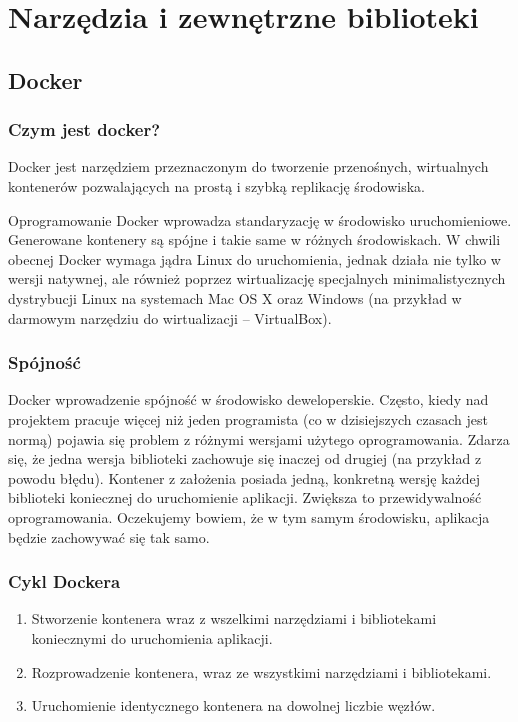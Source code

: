 \chapter{Narzędzia i zewnętrzne biblioteki}

\section{Docker}

\subsection[Czym jest docker?]{Czym jest docker?}
\par{Docker jest narzędziem przeznaczonym do tworzenie przenośnych, wirtualnych kontenerów pozwalających na prostą i szybką replikację środowiska.}

\par{Oprogramowanie Docker wprowadza standaryzację w środowisko uruchomieniowe. Generowane kontenery są spójne i takie same w różnych środowiskach. W chwili obecnej Docker wymaga jądra Linux do uruchomienia, jednak działa nie tylko w wersji natywnej, ale również poprzez wirtualizację specjalnych minimalistycznych dystrybucji Linux na systemach Mac OS X oraz Windows (na przykład w darmowym narzędziu do wirtualizacji – VirtualBox).}

\subsection[Spójność]{Spójność}

\par{Docker wprowadzenie spójność w środowisko deweloperskie. Często, kiedy nad projektem pracuje więcej niż jeden programista (co w dzisiejszych czasach jest normą) pojawia się problem z różnymi wersjami użytego oprogramowania. Zdarza się, że jedna wersja biblioteki zachowuje się inaczej od drugiej (na przykład z powodu błędu). Kontener z założenia posiada jedną, konkretną wersję każdej biblioteki koniecznej do uruchomienie aplikacji. Zwiększa to przewidywalność oprogramowania. Oczekujemy bowiem, że w tym samym środowisku, aplikacja będzie zachowywać się tak samo. }

\subsection[Cykl Dockera]{Cykl Dockera}


\begin{enumerate}
\item Stworzenie kontenera wraz z wszelkimi narzędziami i bibliotekami koniecznymi do uruchomienia aplikacji. 
\item Rozprowadzenie kontenera, wraz ze wszystkimi narzędziami i bibliotekami. 
\item Uruchomienie identycznego kontenera na dowolnej liczbie węzłów. 
\end{enumerate}

